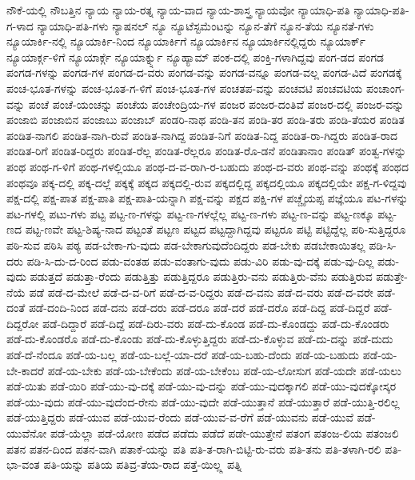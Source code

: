 {ನೌಕೆ-ಯಲ್ಲಿ
ನೌಬತ್ತಿನ
ನ್ಯಾಯ
ನ್ಯಾಯ-ರತ್ನ
ನ್ಯಾಯ-ವಾದ
ನ್ಯಾಯ-ಶಾಸ್ತ್ರ
ನ್ಯಾಯವೋ
ನ್ಯಾಯಾಧಿ-ಪತಿ
ನ್ಯಾಯಾಧಿ-ಪತಿ-ಗ-ಳಾದ
ನ್ಯಾಯಾಧಿ-ಪತಿ-ಗಳು
ನ್ಯಾಷನಲ್
ನ್ಯೂ
ನ್ಯೂಟೆಸ್ಟಮೆಂಟನ್ನು
ನ್ಯೂನ-ತೆಗೆ
ನ್ಯೂನ-ತೆಯ
ನ್ಯೂನತೆ-ಗಳು
ನ್ಯೂಯಾರ್ಕಿ-ನಲ್ಲಿ
ನ್ಯೂಯಾರ್ಕಿ-ನಿಂದ
ನ್ಯೂಯಾರ್ಕಿಗೆ
ನ್ಯೂಯಾರ್ಕಿನ
ನ್ಯೂಯಾರ್ಕಿನಲ್ಲಿದ್ದರು
ನ್ಯೂಯಾರ್ಕ್
ನ್ಯೂಯಾರ್ಕ್ಗ-ಳಿಗೆ
ನ್ಯೂಯಾರ್ಕ್ಗೆ
ನ್ಯೂಯಾರ್ಕ್ನ್ನು
ನ್ಯೂಹ್ಯಾಮ್
ಪಂಕ-ದಲ್ಲಿ
ಪಂಕ್ತಿ-ಗಳಾಗಿದ್ದವು
ಪಂಗ-ಡದ
ಪಂಗಡ
ಪಂಗಡ-ಗಳನ್ನು
ಪಂಗಡ-ಗಳ
ಪಂಗಡ-ದ-ವರು
ಪಂಗಡ-ವನ್ನು
ಪಂಗಡ-ವನ್ನೂ
ಪಂಗಡ-ವಲ್ಲ
ಪಂಗಡ-ವಿದೆ
ಪಂಗಡಕ್ಕೆ
ಪಂಚ-ಭೂತ-ಗಳನ್ನು
ಪಂಚ-ಭೂತ-ಗ-ಳಿಗೆ
ಪಂಚ-ಭೂತ-ಗಳ
ಪಂಚತಪ-ವನ್ನು
ಪಂಚವಟಿ
ಪಂಚವಟಿಯ
ಪಂಚಾಂಗ-ವನ್ನು
ಪಂಚೆ
ಪಂಚೆ-ಯಂಚನ್ನು
ಪಂಚೆಯ
ಪಂಚೇಂದ್ರಿಯ-ಗಳ
ಪಂಜರ
ಪಂಜರ-ದಂತಿವೆ
ಪಂಜರ-ದಲ್ಲಿ
ಪಂಜರ-ವನ್ನು
ಪಂಜಾಬಿ
ಪಂಜಾಬಿನ
ಪಂಜಾಬು
ಪಂಜಾಬ್
ಪಂಡರಿ-ನಾಥ
ಪಂಡಿ-ತನ
ಪಂಡಿ-ತರ
ಪಂಡಿ-ತರು
ಪಂಡಿ-ತೆಯರ
ಪಂಡಿತ
ಪಂಡಿತ-ನಾಗಲಿ
ಪಂಡಿತ-ನಾಗಿ-ರುವೆ
ಪಂಡಿತ-ನಾಗಿದ್ದ
ಪಂಡಿತ-ನಿಗೆ
ಪಂಡಿತ-ನಿದ್ದ
ಪಂಡಿತ-ರಾ-ಗಿದ್ದರು
ಪಂಡಿತ-ರಾದ
ಪಂಡಿತ-ರಿಗೆ
ಪಂಡಿತ-ರಿದ್ದರು
ಪಂಡಿತ-ರೆಲ್ಲ
ಪಂಡಿತ-ರೆಲ್ಲರೂ
ಪಂಡಿತ-ರೊ-ಡನೆ
ಪಂಡಿತಾನಾಂ
ಪಂಡಿತ್
ಪಂತ್ವ-ಗಳನ್ನು
ಪಂಥ
ಪಂಥ-ಗ-ಳಿಗೆ
ಪಂಥ-ಗಳಲ್ಲಿಯೂ
ಪಂಥ-ದ-ವ-ರಾಗಿ-ರ-ಬಹುದು
ಪಂಥ-ದ-ವರು
ಪಂಥ-ವನ್ನು
ಪಂಥಕ್ಕೆ
ಪಂಥದ
ಪಂಥವೂ
ಪಕ್ಕ-ದಲ್ಲಿ
ಪಕ್ಕ-ದಲ್ಲೆ
ಪಕ್ಕಕ್ಕೆ
ಪಕ್ಕದ
ಪಕ್ಕದಲ್ಲಿ-ರುವ
ಪಕ್ಕದಲ್ಲಿದ್ದ
ಪಕ್ಕದಲ್ಲಿಯೂ
ಪಕ್ಕದಲ್ಲಿಯೇ
ಪಕ್ಷ-ಗ-ಳಿದ್ದವು
ಪಕ್ಷ-ದಲ್ಲಿ
ಪಕ್ಷ-ಪಾತ
ಪಕ್ಷ-ಪಾತಿ
ಪಕ್ಷ-ಪಾತಿ-ಯನ್ನಾಗಿ
ಪಕ್ಷ-ವನ್ನು
ಪಕ್ಷದ
ಪಕ್ಷಿ-ಗಳ
ಪಚ್ಚೈಯಪ್ಪ
ಪಜ್ಞೆಯೂ
ಪಟ-ಗಳನ್ನು
ಪಟ-ಗಳಲ್ಲಿ
ಪಟು-ಗಳು
ಪಟ್ಟ
ಪಟ್ಟ-ಣ-ಗಳನ್ನು
ಪಟ್ಟ-ಣ-ಗಳಲ್ಲೆಲ್ಲ
ಪಟ್ಟ-ಣ-ಗಳು
ಪಟ್ಟ-ಣ-ವನ್ನು
ಪಟ್ಟ-ಣಕ್ಕೂ
ಪಟ್ಟ-ಣದ
ಪಟ್ಟ-ಣವೇ
ಪಟ್ಟ-ಶಿಷ್ಯ-ನಾದ
ಪಟ್ಟಂತೆ
ಪಟ್ಟಣ
ಪಟ್ಟದ
ಪಟ್ಟದ್ದಾಗಿದ್ದವು
ಪಟ್ಟರೂ
ಪಟ್ಟಿ
ಪಟ್ಟಿದ್ದೆಲ್ಲ
ಪಠಿ-ಸುತ್ತಿದ್ದರೂ
ಪಠಿ-ಸುವ
ಪಠಿಸಿ
ಪಠ್ಯ
ಪಡ-ಬೇಕಾ-ಗು-ವುದು
ಪಡ-ಬೇಕಾಗುವುದೆಂದಿದ್ದರು
ಪಡ-ಬೇಕು
ಪಡಬೇಕಾಯಿತಲ್ಲ
ಪಡಿ-ಸಿ-ದರು
ಪಡಿ-ಸಿ-ದು-ದ-ರಿಂದ
ಪಡು-ವಂತಹ
ಪಡು-ವಂತಾಗು-ವುದು
ಪಡು-ವಿರಿ
ಪಡು-ವು-ದಕ್ಕೆ
ಪಡು-ವು-ದಿಲ್ಲ
ಪಡು-ವುದು
ಪಡುತ್ತದೆ
ಪಡುತ್ತಾ-ರೆಂದು
ಪಡುತ್ತಿತ್ತು
ಪಡುತ್ತಿದ್ದರೂ
ಪಡುತ್ತಿರು-ವನು
ಪಡುತ್ತಿರು-ವೆನು
ಪಡುತ್ತಿರುವ
ಪಡುತ್ತೇ-ನೆಯೆ
ಪಡೆ
ಪಡೆ-ದ-ಮೇಲೆ
ಪಡೆ-ದ-ವ-ರಿಗೆ
ಪಡೆ-ದ-ವ-ರಿದ್ದರು
ಪಡೆ-ದ-ವನು
ಪಡೆ-ದ-ವರು
ಪಡೆ-ದ-ವರೇ
ಪಡೆ-ದಂತೆ
ಪಡೆ-ದಂದಿ-ನಿಂದ
ಪಡೆ-ದನು
ಪಡೆ-ದರು
ಪಡೆ-ದರೂ
ಪಡೆ-ದರೆ
ಪಡೆ-ದರೊ
ಪಡೆ-ದಿದ್ದ
ಪಡೆ-ದಿದ್ದರೆ
ಪಡೆ-ದಿದ್ದರೋ
ಪಡೆ-ದಿದ್ದಾರೆ
ಪಡೆ-ದಿದ್ದೆ
ಪಡೆ-ದಿರು-ವರು
ಪಡೆ-ದು-ಕೊಂಡ
ಪಡೆ-ದು-ಕೊಂಡದ್ದು
ಪಡೆ-ದು-ಕೊಂಡರು
ಪಡೆ-ದು-ಕೊಂಡರೊ
ಪಡೆ-ದು-ಕೊಂಡು
ಪಡೆ-ದು-ಕೊಳ್ಳುತ್ತಿದ್ದರು
ಪಡೆ-ದು-ಕೊಳ್ಳುವ
ಪಡೆ-ದು-ದನ್ನು
ಪಡೆ-ದುದು
ಪಡೆ-ದೆ-ನೆಂದೂ
ಪಡೆ-ಯ-ಬಲ್ಲ
ಪಡೆ-ಯ-ಬಲ್ಲೆ-ಯಾ-ದರೆ
ಪಡೆ-ಯ-ಬಹು-ದೆಂದು
ಪಡೆ-ಯ-ಬಹುದು
ಪಡೆ-ಯ-ಬೇ-ಕಾದರೆ
ಪಡೆ-ಯ-ಬೇಕು
ಪಡೆ-ಯ-ಬೇಕೆಂದು
ಪಡೆ-ಯ-ಬೇಕೆಂಬ
ಪಡೆ-ಯ-ಲೋಸುಗ
ಪಡೆ-ಯದೇ
ಪಡೆ-ಯಲು
ಪಡೆ-ಯಿತು
ಪಡೆ-ಯಿರಿ
ಪಡೆ-ಯು-ವು-ದಕ್ಕೆ
ಪಡೆ-ಯು-ವು-ದನ್ನು
ಪಡೆ-ಯು-ವುದಕ್ಕಾಗಲಿ
ಪಡೆ-ಯು-ವುದಕ್ಕೋಸ್ಕರ
ಪಡೆ-ಯು-ವುದು
ಪಡೆ-ಯು-ವುದೆಂದ-ರೇನು
ಪಡೆ-ಯು-ವುದೇ
ಪಡೆ-ಯುತ್ತಾನೆ
ಪಡೆ-ಯುತ್ತಾರೆ
ಪಡೆ-ಯುತ್ತಿ-ರಲಿಲ್ಲ
ಪಡೆ-ಯುತ್ತಿದ್ದರು
ಪಡೆ-ಯುವ
ಪಡೆ-ಯುವ-ರೆಂದು
ಪಡೆ-ಯುವ-ವ-ರೆಗೆ
ಪಡೆ-ಯುವನು
ಪಡೆ-ಯುವೆ
ಪಡೆ-ಯುವೆನೋ
ಪಡೆ-ಯೆಲ್ಲಾ
ಪಡೆ-ಯೋಣ
ಪಡೆದ
ಪಡೆದು
ಪಡೆದೆ
ಪಡೇ-ಯುತ್ತೇನೆ
ಪತಂಗ
ಪತಂಜ-ಲಿಯ
ಪತಂಜಲಿ
ಪತನ
ಪತನ-ದಿಂದ
ಪತನ-ವಾಗಿ
ಪತಾಕೆ-ಯನ್ನು
ಪತಿ
ಪತಿ-ತ-ರಾಗಿ-ಬಿಟ್ಟಿ-ರು-ವರು
ಪತಿ-ತನು
ಪತಿ-ತಳಾಗಿ-ರಲಿ
ಪತಿ-ಭಾ-ವಂತ
ಪತಿ-ಯನ್ನು
ಪತಿಯ
ಪತಿವ್ರ-ತೆಯ-ರಾದ
ಪತ್ತೆ-ಯಿಲ್ಲ್ಲ
ಪತ್ನಿ
}
